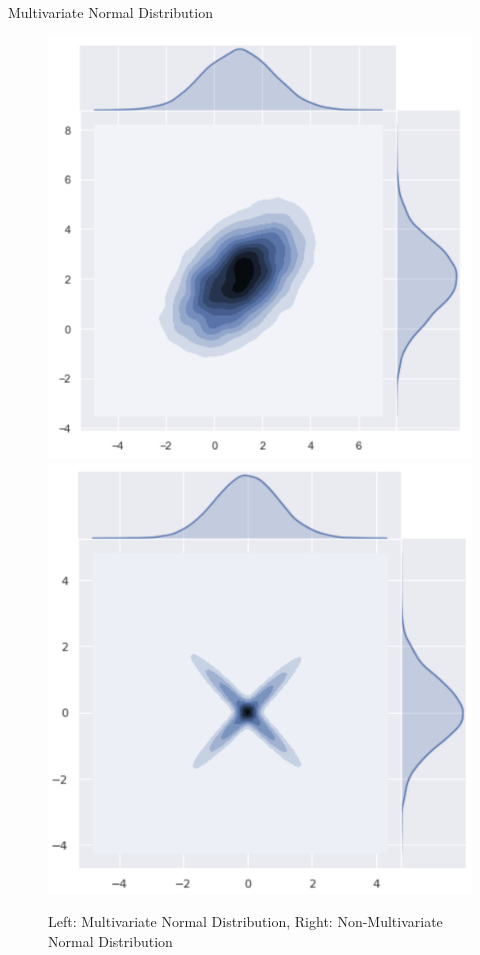 \documentclass[10pt]{beamer}
\begin{document}
\begin{frame}{Multivariate Normal Distribution}{\cite{multivariate_normal_orduz_2019}}
\begin{center}
\begin{figure}
\includegraphics[scale=0.15]{images/multinormal_density.png} 
\includegraphics[scale=0.15]{images/no_multinormal_density.png} 
\caption{Left: Multivariate Normal Distribution, Right: Non-Multivariate Normal Distribution}
\end{figure}
\end{center}
\end{frame}
\end{document}
